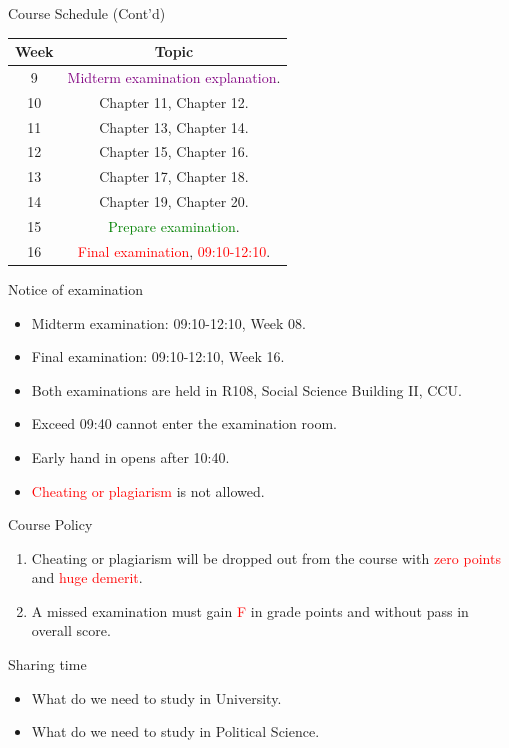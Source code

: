 \documentclass{beamer}
\begin{document}
\begin{frame}{Course Schedule (Cont'd)}
\begin{center}
\begin{tabular}{|c|c|}
\hline
Week & Topic \\
\hline
9 & \textcolor{purple}{Midterm examination explanation}.\\
\hline
10 & Chapter 11, Chapter 12.\\
\hline
11 & Chapter 13, Chapter 14.\\
\hline
12 & Chapter 15, Chapter 16.\\
\hline
13 & Chapter 17, Chapter 18.\\
\hline
14 & Chapter 19, Chapter 20.\\
\hline
15 & \textcolor{Green}{Prepare examination}.\\
\hline
16 & \textcolor{red}{Final examination}, \textcolor{red}{09:10-12:10}.\\
\hline
\end{tabular}
\end{center}
\end{frame}
\begin{frame}{Notice of examination}
\begin{itemize}
\item Midterm examination: 09:10-12:10, Week 08.
\item Final examination: 09:10-12:10, Week 16.
\item Both examinations are held in R108, Social Science Building II, CCU.
\item Exceed 09:40 cannot enter the examination room.
\item Early hand in opens after 10:40.
\item \textcolor{red}{Cheating or plagiarism} is not allowed.
\end{itemize}
\end{frame}
\begin{frame}{Course Policy}
\begin{enumerate}
\item Cheating or plagiarism will be dropped out from the course with \textcolor{red}{zero points} and \textcolor{red}{huge demerit}. \\
\item A missed examination must gain \textcolor{red}{F} in grade points and without pass in overall score. 
\end{enumerate}
\end{frame}
\begin{frame}{Sharing time}
\begin{itemize}
\item What do we need to study in University.
\item What do we need to study in Political Science.
\end{itemize}
\end{frame}
\end{document}
